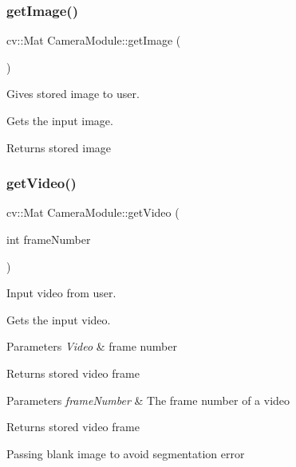 \subsubsection{\texorpdfstring{get\+Image()}{getImage()}}
{\footnotesize\ttfamily cv\+::\+Mat Camera\+Module\+::get\+Image (\begin{DoxyParamCaption}{ }\end{DoxyParamCaption})}



Gives stored image to user. 

Gets the input image.

\begin{DoxyReturn}{Returns}
stored image 
\end{DoxyReturn}
\mbox{\label{class_camera_module_ab4375cbacea80f50261c18fb4c7804d4}} 
\subsubsection{\texorpdfstring{get\+Video()}{getVideo()}}
{\footnotesize\ttfamily cv\+::\+Mat Camera\+Module\+::get\+Video (\begin{DoxyParamCaption}\item[{int}]{frame\+Number }\end{DoxyParamCaption})}



Input video from user. 

Gets the input video.


\begin{DoxyParams}{Parameters}
{\em Video} & frame number\\
\hline
\end{DoxyParams}
\begin{DoxyReturn}{Returns}
stored video frame
\end{DoxyReturn}

\begin{DoxyParams}{Parameters}
{\em frame\+Number} & The frame number of a video\\
\hline
\end{DoxyParams}
\begin{DoxyReturn}{Returns}
stored video frame 
\end{DoxyReturn}
Passing blank image to avoid segmentation error \mbox{\label{class_camera_module_a8193de86e0feb9cefa323d633b5d3e35}} 
